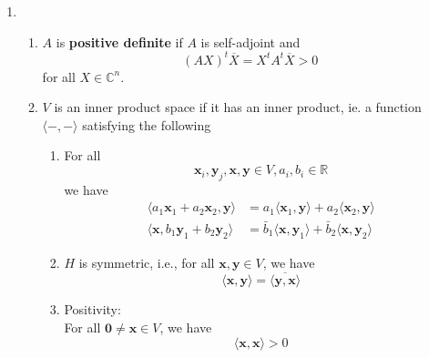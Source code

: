 \documentclass[12pt]{article}
\theoremstyle{definition}
\begin{document}
\begin{enumerate}
\begin{enumerate}
\end{enumerate}
\item \begin{enumerate}
\item $A$ is \textbf{positive definite} if $A$ is self-adjoint and
\[
(AX)^t\overline{X}=X^tA^t\overline{X}>0
\]
for all $X\in\mathbb{C}^n$.
\item $V$ is an inner product space if it has an inner product, ie. a function $\langle -,-\rangle$ satisfying the following
\begin{enumerate}
\item For all
\[
\mathbf{x}_i, \mathbf{y}_j, \mathbf{x}, \mathbf{y}\in V, a_i, b_i\in\mathbb{R}
\]
we have
\[
\begin{aligned}
\langle a_1\mathbf{x}_1+a_2\mathbf{x}_2,\mathbf{y}\rangle &= a_1\langle \mathbf{x}_1, \mathbf{y}\rangle+a_2\langle \mathbf{x}_2, \mathbf{y}\rangle\\
\langle \mathbf{x}, b_1\mathbf{y}_1+b_2\mathbf{y}_2\rangle &= \bar{b}_1\langle \mathbf{x}, \mathbf{y}_1\rangle+\bar{b}_2\langle \mathbf{x}, \mathbf{y}_2\rangle
\end{aligned}
\]
\item $H$ is symmetric, i.e., for all $\mathbf{x},\mathbf{y}\in V$, we have
\[
\langle \mathbf{x},\mathbf{y}\rangle = \overline{\langle \mathbf{y},\mathbf{x}\rangle}
\]
\item Positivity:\\
For all $\mathbf{0}\neq \mathbf{x}\in V$, we have
\[
\langle \mathbf{x},\mathbf{x}\rangle >0
\]
\end{enumerate}


\end{enumerate}
\end{enumerate}
\end{document}
